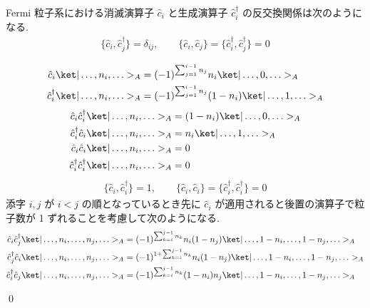 \documentclass[uplatex,dvipdfmx,a4paper,11pt]{jlreq}
\makeatletter
\numberwithin{equation}{section}
\theoremstyle{definition}
\renewenvironment{proof}[1][\proofname]{\par
  \normalfont
  \topsep6\p@\@plus6\p@ \trivlist
  \item[\hskip\labelsep{\bfseries #1}\@addpunct{\bfseries}]\ignorespaces\quad\par
}{
  \qed\endtrivlist\@endpefalse
}
\renewcommand\proofname{証明}
\makeatother
\begin{document}
\begin{theorem}
  Fermi 粒子系における消滅演算子 $\hat{c}_i$ と生成演算子 $\hat{c}_i^\dagger$ の反交換関係は次のようになる.
  \begin{align}
    \{\hat{c}_i, \hat{c}_j^\dagger\} = \delta_{ij}, \qquad \{\hat{c}_i, \hat{c}_j\} = \{\hat{c}_i^\dagger, \hat{c}_j^\dagger\} = 0
  \end{align}
\end{theorem}
\begin{proof}
  \begin{align}
    \hat{c}_i\ket|\ldots,n_i,\ldots>_A         & = (-1)^{\sum_{j=1}^{i-1}n_j}n_i\ket|\ldots,0,\ldots>_A       \\
    \hat{c}_i^\dagger\ket|\ldots,n_i,\ldots>_A & = (-1)^{\sum_{j=1}^{i-1}n_j}(1 - n_i)\ket|\ldots,1,\ldots>_A
  \end{align}
  \begin{align}
    \hat{c}_i\hat{c}_i^\dagger\ket|\ldots,n_i,\ldots>_A         & = (1 - n_i)\ket|\ldots,0,\ldots>_A \\
    \hat{c}_i^\dagger\hat{c}_i\ket|\ldots,n_i,\ldots>_A         & = n_i\ket|\ldots,1,\ldots>_A       \\
    \hat{c}_i\hat{c}_i\ket|\ldots,n_i,\ldots>_A                 & = 0                                \\
    \hat{c}_i^\dagger\hat{c}_i^\dagger\ket|\ldots,n_i,\ldots>_A & = 0
  \end{align}
  \begin{align}
    \{\hat{c}_i, \hat{c}_i^\dagger\} = 1, \qquad \{\hat{c}_i, \hat{c}_i\} = \{\hat{c}_i^\dagger, \hat{c}_i^\dagger\} = 0
  \end{align}
  添字 $i, j$ が $i < j$ の順となっているとき先に $\hat{c}_i$ が適用されると後置の演算子で粒子数が 1 ずれることを考慮して次のようになる.
  \begin{align}
    \hat{c}_i\hat{c}_j^\dagger\ket|\ldots,n_i,\ldots,n_j,\ldots>_A         & = (-1)^{\sum_{k=i}^{j-1}n_k}n_i(1 - n_j)\ket|\ldots,1-n_i,\ldots,1-n_j,\ldots>_A           \\
    \hat{c}_j^\dagger\hat{c}_i\ket|\ldots,n_i,\ldots,n_j,\ldots>_A         & = (-1)^{1 + \sum_{k=i}^{j-1}n_k}n_i(1 - n_j)\ket|\ldots,1-n_i,\ldots,1-n_j,\ldots>_A       \\
    \hat{c}_i^\dagger\hat{c}_j\ket|\ldots,n_i,\ldots,n_j,\ldots>_A         & = (-1)^{\sum_{k=i}^{j-1}n_k}(1 - n_i)n_j\ket|\ldots,1-n_i,\ldots,1-n_j,\ldots>_A           \\

\end{align}
\end{proof}
\end{document}

